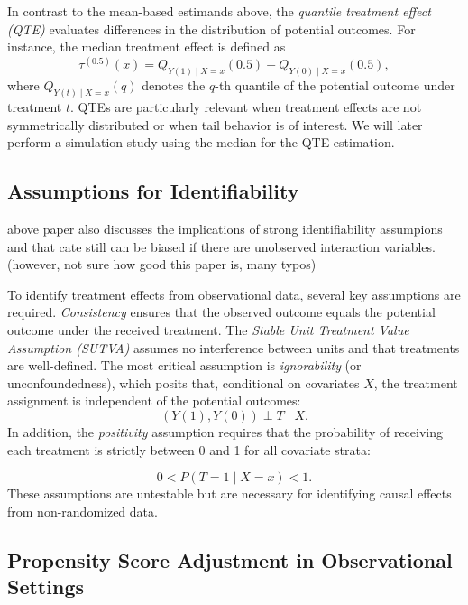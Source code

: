 In contrast to the mean-based estimands above, the \textit{quantile treatment effect (QTE)} evaluates differences in the distribution of potential outcomes. For instance, the median treatment effect is defined as
\begin{equation}
\tau^{(0.5)}(x) = Q_{Y(1) \mid X = x}(0.5) - Q_{Y(0) \mid X = x}(0.5),
\end{equation}
where $Q_{Y(t) \mid X = x}(q)$ denotes the $q$-th quantile of the potential outcome under treatment $t$. QTEs are particularly relevant when treatment effects are not symmetrically distributed or when tail behavior is of interest. We will later perform a simulation study using the median for the QTE estimation.

\subsection{Assumptions for Identifiability}



above paper also discusses the implications of strong identifiability assumpions and that cate still can be biased if there are unobserved interaction variables. (however, not sure how good this paper is, many typos)

To identify treatment effects from observational data, several key assumptions are required. \textit{Consistency} ensures that the observed outcome equals the potential outcome under the received treatment. The \textit{Stable Unit Treatment Value Assumption (SUTVA)} assumes no interference between units and that treatments are well-defined. The most critical assumption is \textit{ignorability} (or unconfoundedness), which posits that, conditional on covariates $X$, the treatment assignment is independent of the potential outcomes:
\begin{equation}
(Y(1), Y(0)) \perp T \mid X.
\end{equation}
In addition, the \textit{positivity} assumption requires that the probability of receiving each treatment is strictly between 0 and 1 for all covariate strata:

\begin{equation}
0 < P(T = 1 \mid X = x) < 1.
\end{equation}
These assumptions are untestable but are necessary for identifying causal effects from non-randomized data.

\subsection{Propensity Score Adjustment in Observational Settings}

